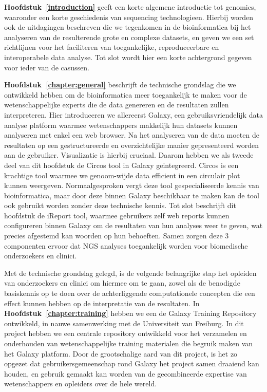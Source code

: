 \textbf{Hoofdstuk~\ref{introduction}} geeft een korte algemene introductie tot genomics, waaronder een korte geschiedenis van sequencing technologieen.
Hierbij worden ook de uitdagingen beschreven die we tegenkomen in de bioinformatica bij het analyseren van de resulterende grote en complexe datasets, en geven we een set richtlijnen voor het faciliteren van toegankelijke, reproduceerbare en interoperabele data analyse.
Tot slot wordt hier een korte achtergrond gegeven voor ieder van de casussen.

\textbf{Hoofdstuk~\ref{chapter:general}} beschrijft de technische grondslag die we ontwikkeld hebben om de bioinformatica meer toegankelijk te maken voor de wetenschappelijke experts die de data genereren en de resultaten zullen interpreteren.
Hier introduceren we allereerst Galaxy, een gebruiksvriendelijk data analyse platform waarmee wetenschappers makkelijk hun datasets kunnen analyseren met enkel een web browser. Na het analyseren van de data moeten de resultaten op een gestructureerde en overzichtelijke manier gepresenteerd worden aan de gebruiker. Visualizatie is hierbij cruciaal.
Daarom hebben we als tweede deel van dit hoofdstuk de Circos tool in Galaxy geintegreerd. Circos is een krachtige tool waarmee we genoom-wijde data efficient in een circulair plot kunnen weergeven.
Normaalgesproken vergt deze tool gespecialiseerde kennis van bioinformatica, maar door deze binnen Galaxy beschikbaar te maken kan de tool ook gebruikt worden zonder deze technische kennis.
Tot slot beschrijft dit hoofdstuk de iReport tool, waarmee gebruikers zelf web reports kunnen configureren binnen Galaxy om de resultaten van hun analyses weer te geven, wat precies afgestemd kan woorden op hun behoeften.
Samen zorgen deze 3 componenten ervoor dat NGS analyses toegankelijk worden voor biomedische onderzoekers en clinici.

Met de technische grondslag gelegd, is de volgende belangrijke stap het opleiden van onderzoekers
en clinici om hiermee om te gaan, zowel als de benodigde basiskennis op te doen over de achterliggende computationele concepten die een effect kunnen hebben op de interpretatie van de resultaten.
In \textbf{Hoofdstuk~\ref{chapter:training}} hebben we een de Galaxy Training Repository ontwikkeld, in nauwe samenwerking met de Universiteit van Freiburg.
In dit project hebben we een centrale repository ontwikkeld voor het verzamelen en onderhouden van wetenschappelijke training materialen die begruik maken van het Galaxy platform.
Door de grootschalige aard van dit project, is het zo opgezet dat gebruikersgemeenschap rond Galaxy het project samen draaiend kan houden, en gebruik gemaakt kan worden van de gecombineerde expertise van wetenschappers en opleiders over de hele wereld.

